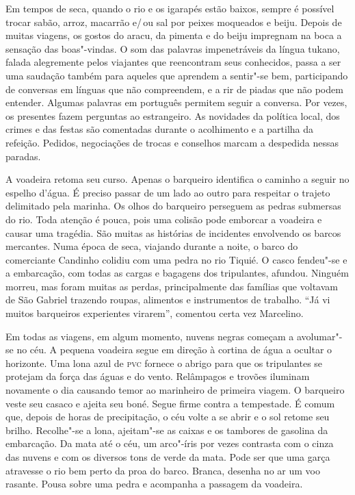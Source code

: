 Em tempos de seca, quando o rio e os igarapés estão baixos, sempre é
possível trocar sabão, arroz, macarrão e/\,ou sal por peixes moqueados e
beiju. Depois de muitas viagens, os gostos do aracu, da pimenta e do
beiju impregnam na boca a sensação das boas"-vindas. O som das palavras
impenetráveis da língua tukano, falada alegremente pelos viajantes que
reencontram seus conhecidos, passa a ser uma saudação também para
aqueles que aprendem a sentir"-se bem, participando de conversas em
línguas que não compreendem, e a rir de piadas que não podem entender.
Algumas palavras em português permitem seguir a conversa. Por vezes, os
presentes fazem perguntas ao estrangeiro. As novidades da política
local, dos crimes e das festas são comentadas durante o acolhimento e a
partilha da refeição. Pedidos, negociações de trocas e conselhos marcam
a despedida nessas paradas.

A voadeira retoma seu curso. Apenas o barqueiro identifica o caminho a
seguir no espelho d'água. É preciso passar de um lado ao outro para
respeitar o trajeto delimitado pela marinha. Os olhos do barqueiro
perseguem as pedras submersas do rio. Toda atenção é pouca, pois uma
colisão pode emborcar a voadeira e causar uma tragédia. São muitas as
histórias de incidentes envolvendo os barcos mercantes. Numa época de
seca, viajando durante a noite, o barco do comerciante Candinho colidiu
com uma pedra no rio Tiquié. O casco fendeu"-se e a embarcação, com todas
as cargas e bagagens dos tripulantes, afundou. Ninguém morreu, mas foram
muitas as perdas, principalmente das famílias que voltavam de São
Gabriel trazendo roupas, alimentos e instrumentos de trabalho. ``Já vi
muitos barqueiros experientes virarem'', comentou certa vez Marcelino.

Em todas as viagens, em algum momento, nuvens negras começam a
avolumar"-se no céu. A pequena voadeira segue em direção à cortina de
água a ocultar o horizonte. Uma lona azul de {\textsc{pvc}} fornece o abrigo para
que os tripulantes se protejam da força das águas e do vento. Relâmpagos
e trovões iluminam novamente o dia causando temor ao marinheiro de
primeira viagem. O barqueiro veste seu casaco e ajeita seu boné. Segue
firme contra a tempestade. É comum que, depois de horas de precipitação,
o céu volte a se abrir e o sol retome seu brilho. Recolhe"-se a lona,
ajeitam"-se as caixas e os tambores de gasolina da embarcação. Da mata
até o céu, um arco"-íris por vezes contrasta com o cinza das nuvens e com
os diversos tons de verde da mata. Pode ser que uma garça atravesse o
rio bem perto da proa do barco. Branca, desenha no ar um voo rasante.
Pousa sobre uma pedra e acompanha a passagem da voadeira.

